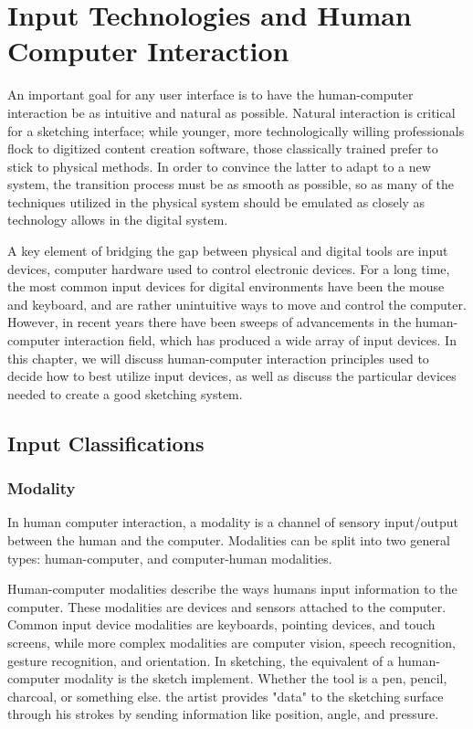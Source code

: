 \chapter{Input Technologies and Human Computer Interaction}
\label{ch:input}

An important goal for any user interface is to have the human-computer interaction be as intuitive and natural as possible.
Natural interaction is critical for a sketching interface; while younger, more technologically willing professionals flock to digitized content creation software, those classically trained prefer to stick to physical methods.
In order to convince the latter to adapt to a new system, the transition process must be as smooth as possible, so as many of the techniques utilized in the physical system should be emulated as closely as technology allows in the digital system.

A key element of bridging the gap between physical and digital tools are input devices, computer hardware used to control electronic devices.
For a long time, the most common input devices for digital environments have been the mouse and keyboard, and are rather unintuitive ways to move and control the computer.
However, in recent years there have been sweeps of advancements in the human-computer interaction field, which has produced a wide array of input devices.
In this chapter, we will discuss human-computer interaction principles used to decide how to best utilize input devices, as well as discuss the particular devices needed to create a good sketching system.



\section{Input Classifications}

\subsection{Modality}

In human computer interaction, a modality is a channel of sensory input/output between the human and the computer. Modalities can be split into two general types: human-computer, and computer-human modalities.

Human-computer modalities describe the ways humans input information to the computer.
These modalities are devices and sensors attached to the computer.
Common input device modalities are keyboards, pointing devices, and touch screens, while more complex modalities are computer vision, speech recognition, gesture recognition, and orientation.
In sketching, the equivalent of a human-computer modality is the sketch implement. 
Whether the tool is a pen, pencil, charcoal, or something else. the artist provides "data" to the sketching surface through his strokes by sending information like position, angle, and pressure.

